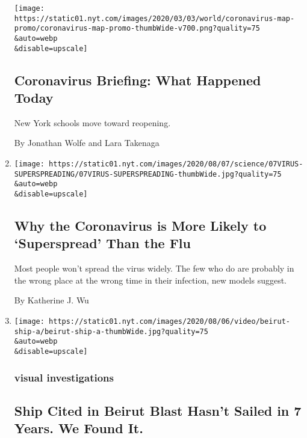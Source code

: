 \begin{enumerate}
  \texttt{[image: https://static01.nyt.com/images/2020/03/03/world/coronavirus-map-promo/coronavirus-map-promo-thumbWide-v700.png?quality=75\\\&auto=webp\\\&disable=upscale]}

  \hypertarget{coronavirus-briefing-what-happened-today}{%
  \subsection{Coronavirus Briefing: What Happened
  Today}\label{coronavirus-briefing-what-happened-today}}

  New York schools move toward reopening.

  By Jonathan Wolfe and Lara Takenaga
\item
  \href{/2020/08/07/health/coronavirus-superspreading-contagion.html}{}

  \texttt{[image: https://static01.nyt.com/images/2020/08/07/science/07VIRUS-SUPERSPREADING/07VIRUS-SUPERSPREADING-thumbWide.jpg?quality=75\\\&auto=webp\\\&disable=upscale]}

  \hypertarget{why-the-coronavirus-is-more-likely-to-superspread-than-the-flu}{%
  \subsection{Why the Coronavirus is More Likely to `Superspread' Than
  the
  Flu}\label{why-the-coronavirus-is-more-likely-to-superspread-than-the-flu}}

  Most people won't spread the virus widely. The few who do are probably
  in the wrong place at the wrong time in their infection, new models
  suggest.

  By Katherine J. Wu
\item
  \href{/2020/08/07/world/middleeast/lebanon-explosion-ship.html}{}

  \texttt{[image: https://static01.nyt.com/images/2020/08/06/video/beirut-ship-a/beirut-ship-a-thumbWide.jpg?quality=75\\\&auto=webp\\\&disable=upscale]}

  \hypertarget{visual-investigations}{%
  \subsubsection{visual investigations}\label{visual-investigations}}

  \hypertarget{ship-cited-in-beirut-blast-hasnt-sailed-in-7-years-we-found-it}{%
  \subsection{Ship Cited in Beirut Blast Hasn't Sailed in 7 Years. We
  Found
  It.}\label{ship-cited-in-beirut-blast-hasnt-sailed-in-7-years-we-found-it}}


\end{enumerate}
